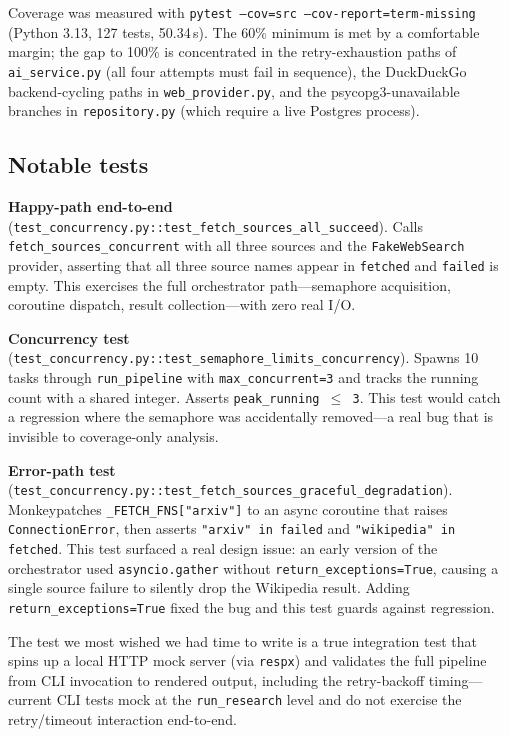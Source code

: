 \documentclass[11pt,a4paper]{article}
\begin{document}
Coverage was measured with \texttt{pytest --cov=src --cov-report=term-missing}
(Python 3.13, 127 tests, 50.34\,s). The 60\% minimum is met by a comfortable margin;
the gap to 100\% is concentrated in the retry-exhaustion paths of
\texttt{ai\_service.py} (all four attempts must fail in sequence), the DuckDuckGo
backend-cycling paths in \texttt{web\_provider.py}, and the psycopg3-unavailable
branches in \texttt{repository.py} (which require a live Postgres process).

\subsection{Notable tests}

\textbf{Happy-path end-to-end} (\texttt{test\_concurrency.py::test\_fetch\_sources\_all\_succeed}).
Calls \texttt{fetch\_sources\_concurrent} with all three sources and the
\texttt{FakeWebSearch} provider, asserting that all three source names appear in
\texttt{fetched} and \texttt{failed} is empty. This exercises the full orchestrator
path---semaphore acquisition, coroutine dispatch, result collection---with zero
real I/O.

\textbf{Concurrency test} (\texttt{test\_concurrency.py::test\_semaphore\_limits\_concurrency}).
Spawns 10 tasks through \texttt{run\_pipeline} with \texttt{max\_concurrent=3} and
tracks the running count with a shared integer. Asserts \texttt{peak\_running $\leq$ 3}.
This test would catch a regression where the semaphore was accidentally removed---a
real bug that is invisible to coverage-only analysis.

\textbf{Error-path test} (\texttt{test\_concurrency.py::test\_fetch\_sources\_graceful\_degradation}).
Monkeypatches \texttt{\_FETCH\_FNS["arxiv"]} to an async coroutine that raises
\texttt{ConnectionError}, then asserts \texttt{"arxiv" in failed} and
\texttt{"wikipedia" in fetched}. This test surfaced a real design issue: an early
version of the orchestrator used \texttt{asyncio.gather} without
\texttt{return\_exceptions=True}, causing a single source failure to silently drop
the Wikipedia result. Adding \texttt{return\_exceptions=True} fixed the bug and
this test guards against regression.

The test we most wished we had time to write is a true integration test that spins up a
local HTTP mock server (via \texttt{respx}) and validates the full pipeline from CLI
invocation to rendered output, including the retry-backoff timing---current CLI tests
mock at the \texttt{run\_research} level and do not exercise the retry/timeout
interaction end-to-end.
\end{document}
